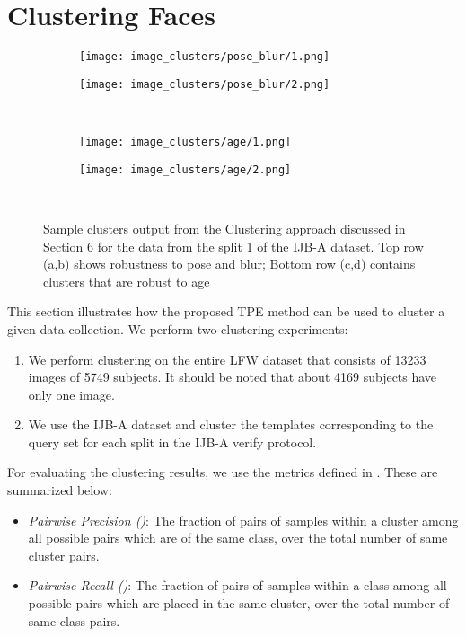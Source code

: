 \documentclass[10pt,twocolumn,letterpaper]{article}
\begin{document}
 \section{Clustering Faces}\label{sec:cluster}


\begin{figure*}
\begin{subfigure}{.5\textwidth}
  \centering
  \texttt{[image: image\_clusters/pose\_blur/1.png]}
  \caption{}
  \label{fig:sfig1}
\end{subfigure}\begin{subfigure}{.5\textwidth}
  \centering
  \texttt{[image: image\_clusters/pose\_blur/2.png]}
    \caption{}
  \label{fig:sfig2}
\end{subfigure}\\
\begin{subfigure}{.5\textwidth}
  \centering
  \texttt{[image: image\_clusters/age/1.png]}
    \caption{}
  \label{fig:sfig3}
\end{subfigure}\begin{subfigure}{.5\textwidth}
  \centering
  \texttt{[image: image\_clusters/age/2.png]}
    \caption{}
  \label{fig:sfig4}
\end{subfigure} \\
\caption{Sample clusters output from the Clustering approach discussed in Section 6 for the data from the split 1 of the IJB-A dataset. Top row (a,b) shows robustness to pose and blur; Bottom row (c,d) contains clusters that are robust to age}
\label{fig:cluster}
\end{figure*}

This section illustrates how the proposed TPE method can be used to cluster a
given data collection. We perform two clustering experiments:
\begin{enumerate}[leftmargin=*]
\item We perform clustering on the entire LFW \cite{lfw} dataset that consists
  of 13233 images of 5749 subjects. It should be noted that about 4169 subjects have only one image.
\item We use the IJB-A dataset and cluster the templates corresponding to the query set for each split in the IJB-A verify protocol.
\end{enumerate}

For evaluating the clustering results, we use the metrics defined in
\cite{msu_cluster}. These are summarized below:
\begin{itemize}[leftmargin=*]
\item \textit{Pairwise Precision ()}: The fraction of pairs of samples
  within a cluster among all possible pairs which are of the same class, over
  the total number of same cluster pairs.
\item \textit{Pairwise Recall ()}: The fraction of pairs of samples
  within a class among all possible pairs which are placed in the same cluster,
  over the total number of same-class pairs.
\end{itemize}
\end{document}
